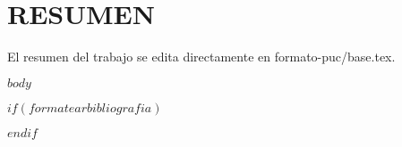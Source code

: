 \documentclass[12pt,reqno,oneside,pdftex]{formato-puc/puctesis} %
\begin{document}
\chapter*{RESUMEN}

El resumen del trabajo se edita directamente en formato-puc/base.tex.

\cleardoublepage %



\NoChapterPageNumber           %


$body$




$if(formatearbibliografia)$
\cleardoublepage
\nocite{*} %
 

$endif$







\end{document}
